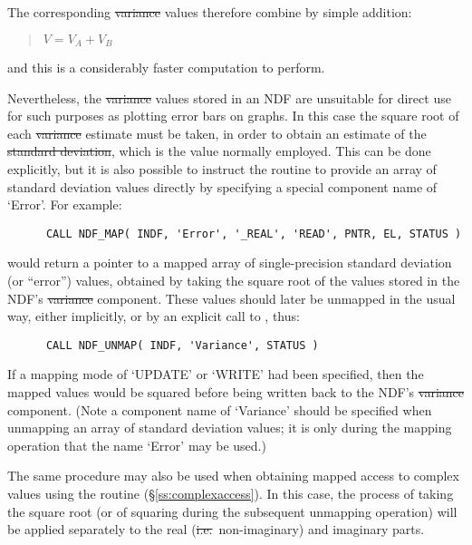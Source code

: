 The corresponding \st{variance\/} values therefore combine by simple
addition: 

\small
\begin{quote}
\begin{center}
$V = V_{A} + V_{B}$
\end{center}
\end{quote}
\normalsize

and this is a considerably faster computation to perform.

Nevertheless, the \st{variance\/} values stored in an NDF are unsuitable
for direct use for such purposes as plotting error bars on graphs. 
In this case the square root of each \st{variance\/} estimate must be
taken, in order to obtain an estimate of the \st{standard deviation}, which
is the value normally employed. 
This can be done explicitly, but it is also possible to instruct the
 routine to provide an array of standard deviation values directly
by specifying a special component name of `Error'. 
For example:

\small
\begin{verbatim}
      CALL NDF_MAP( INDF, 'Error', '_REAL', 'READ', PNTR, EL, STATUS )
\end{verbatim}
\normalsize

would return a pointer to a mapped array of single-precision standard
deviation (or ``error'') values, obtained by taking the square root of the
values stored in the NDF's \st{variance\/} component. 
These values should later be unmapped in the usual way, either implicitly,
or by an explicit call to , thus: 

\small
\begin{verbatim}
      CALL NDF_UNMAP( INDF, 'Variance', STATUS )
\end{verbatim}
\normalsize

If a mapping mode of `UPDATE' or `WRITE' had been specified, then the mapped
values would be squared before being written back to the NDF's
\st{variance\/} component.  
(Note a component name of `Variance' should be specified when unmapping an 
array of standard deviation values; it is only during the mapping operation 
that the name `Error' may be used.)

The same procedure may also be used when obtaining mapped access to complex
values using the routine  (\S\ref{ss:complexaccess}). 
In this case, the process of taking the square root (or of squaring during
the subsequent unmapping operation) will be applied separately to the real
(\st{i.e.}\ non-imaginary) and imaginary parts. 

